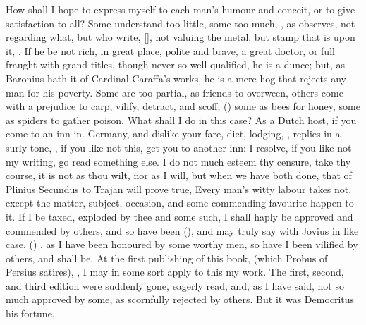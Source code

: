 {How shall I hope to express myself to each man's humour and
conceit, or to give satisfaction to all? Some understand too
little, some too much, , as \Austin{} observes, not regarding what, but who
write, [\baselineskip], not valuing the metal,
but stamp that is upon it, . If he
be not rich, in great place, polite and brave, a great doctor, or full
fraught with grand titles, though never so well qualified, he is a
dunce; but, as Baronius hath it of Cardinal Caraffa's works, he is
a mere hog that rejects any man for his poverty. Some are too partial,
as friends to overween, others come with a prejudice to carp, vilify,
detract, and scoff; () some as bees for honey, some as spiders to gather
poison. What shall I do in this case? As a Dutch host, if you come to
an inn in. Germany, and dislike your fare, diet, lodging, \etc, replies
in a surly tone, , if you like not
this, get you to another inn: I resolve, if you like not my writing, go
read something else. I do not much esteem thy censure, take thy course,
it is not as thou wilt, nor as I will, but when we have both done, that
of Plinius Secundus to Trajan will prove true, Every man's witty
labour takes not, except the matter, subject, occasion, and some
commending favourite happen to it. If I be taxed, exploded by thee and
some such, I shall haply be approved and commended by others, and so
have been (), and may truly say with Jovius in like
case, () , as I have been
honoured by some worthy men, so have I been vilified by others, and
shall be. At the first publishing of this book, (which Probus of
Persius satires), , I may in some sort apply to this my work. The
first, second, and third edition were suddenly gone, eagerly read, and,
as I have said, not so much approved by some, as scornfully rejected by
others. But it was Democritus his fortune, }
